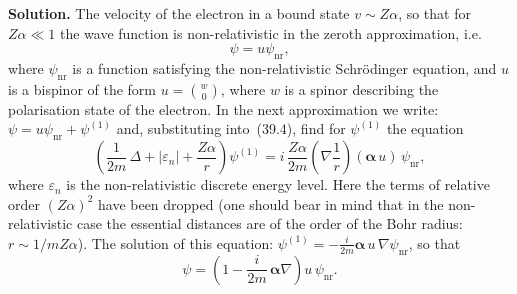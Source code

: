 \textbf{Solution.} The velocity of the electron in a bound state $v \sim Z\alpha$, so that for $Z\alpha \ll 1$ the wave function is non-relativistic in the zeroth approximation, i.e.\
\[
\psi = u\psi_{\mathrm{nr}},
\]
where $\psi_{\mathrm{nr}}$ is a function satisfying the non-relativistic Schr\"odinger equation, and $u$ is a bispinor of the form $u = \binom{w}{0}$, where $w$ is a spinor describing the polarisation state of the electron. In the next approximation we write: $\psi = u\psi_{\mathrm{nr}} + \psi^{(1)}$ and, substituting into~(39.4), find for $\psi^{(1)}$ the equation
\[
\left(\frac{1}{2m}\,\Delta + |\varepsilon_n| + \frac{Z\alpha}{r}\right)\psi^{(1)} = i\,\frac{Z\alpha}{2m}\!\left(\nabla\frac{1}{r}\right)(\boldsymbol{\alpha}\,u)\,\psi_{\mathrm{nr}},
\]
where $\varepsilon_n$ is the non-relativistic discrete energy level. Here the terms of relative order $(Z\alpha)^2$ have been dropped (one should bear in mind that in the non-relativistic case the essential distances are of the order of the Bohr radius: $r \sim 1/mZ\alpha$). The solution of this equation: $\psi^{(1)} = -\frac{i}{2m}\boldsymbol{\alpha}\,u\,\nabla\psi_{\mathrm{nr}}$, so that
\[
\psi = \left(1 - \frac{i}{2m}\,\boldsymbol{\alpha}\nabla\right)u\,\psi_{\mathrm{nr}}.
\]
